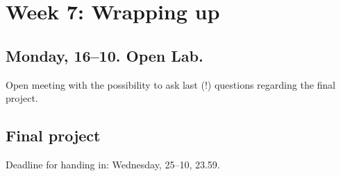 \section*{Week 7: Wrapping up}

\subsection*{Monday, 16--10. Open Lab.}
Open meeting with the possibility to ask last (!) questions regarding the final project.

\subsection*{Final project}
Deadline for handing in: Wednesday, 25--10, 23.59.

